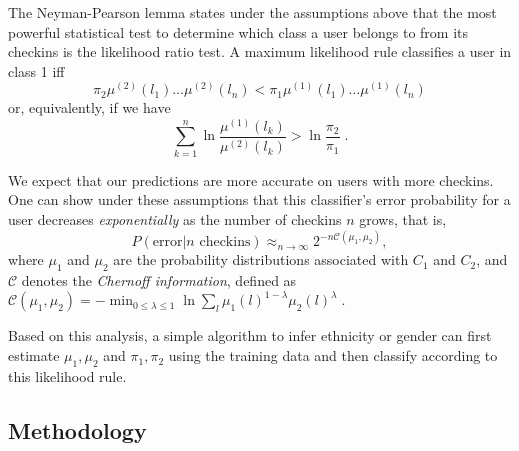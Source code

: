 
The Neyman-Pearson lemma states under the assumptions above that the most powerful statistical test to determine which class a user belongs to from its checkins is the likelihood ratio test. A maximum likelihood rule classifies a user in class 1 iff
\begin{equation}
	\pi_2 \mu^{(2)}({l_1})  \ldots \mu^{(2)}({l_n}) < \pi_1 \mu^{(1)}({l_1})  \ldots \mu^{(1)}({l_n})
\end{equation}	
\noindent or, equivalently, if we have
\begin{equation}
	\sum_{k=1}^n \ln\frac{\mu^{(1)}({l_k})}{\mu^{(2)}({l_k})} > \ln\frac{\pi_2}{\pi_1}\;.
\end{equation}

We expect that our predictions are more accurate on users with more checkins. One can show under these assumptions that this classifier's error probability for a user decreases \emph{exponentially} as the number of checkins $n$ grows, that is,
\begin{equation}
	P(\textrm{error} | n \textrm{ checkins}) 
	\approx_{n\to\infty} 2^{-n \mathcal{C}(\mu_1, \mu_2)},
\end{equation}
where $\mu_1$ and $\mu_2$ are the probability distributions associated with $C_1$ and $C_2$, and $\mathcal{C}$ denotes the \emph{Chernoff information}, defined as 
\(
\mathcal{C}(\mu_1, \mu_2) 
= 
-\min_{0 \leq \lambda \leq 1} \ln \sum_{l} \mu_1(l)^{1-\lambda} \mu_2(l)^\lambda\;.
\)

Based on this analysis, a simple algorithm to infer ethnicity or gender can first estimate $\mu_1,\mu_2$ and $\pi_1,\pi_2$ using the training data and then classify according to this likelihood rule. 


\subsection{Methodology}
\label{subsec:method}


